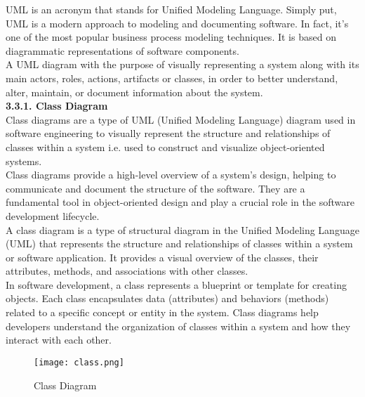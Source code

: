 \documentclass[12pt, English]{article}
\newcommand\tab[1][1cm]{\hspace*{#1}}
\begin{document}
\begin{normalsize}
UML is an acronym that stands for Unified Modeling Language. Simply put, UML is a modern
approach to modeling and documenting software. In fact, it’s one of the most popular business
process modeling techniques. It is based on diagrammatic representations of software components.\\

A UML diagram with the purpose of visually representing a system along with its main actors, roles,
actions, artifacts or classes, in order to better understand, alter, maintain, or document information
about the system.
\\

\textbf{3.3.1. Class Diagram}\\
\tab Class diagrams are a type of UML (Unified Modeling Language) diagram used in software engineering to visually represent the structure and relationships of classes within a system i.e. used to construct and visualize object-oriented systems. \\

Class diagrams provide a high-level overview of a system’s design, helping to communicate and document the structure of the software. They are a fundamental tool in object-oriented design and play a crucial role in the software development lifecycle.\\

A class diagram is a type of structural diagram in the Unified Modeling Language (UML) that represents the structure and relationships of classes within a system or software application. It provides a visual overview of the classes, their attributes, methods, and associations with other classes.\\

In software development, a class represents a blueprint or template for creating objects. Each class encapsulates data (attributes) and behaviors (methods) related to a specific concept or entity in the system. Class diagrams help developers understand the organization of classes within a system and how they interact with each other.
\\
\begin{figure}[htb]
\begin{center}
\texttt{[image: class.png]}
\end{center}
\begin{center}
\renewcommand{\thefigure}{3.3.1.1}
\caption{\footnotesize Class Diagram }
\end{center}
\end{figure}


\end{normalsize}
\end{document}

